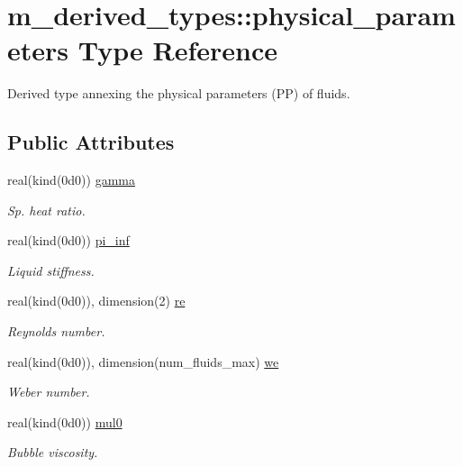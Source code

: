 \hypertarget{structm__derived__types_1_1physical__parameters}{}\section{m\+\_\+derived\+\_\+types\+:\+:physical\+\_\+parameters Type Reference}
\label{structm__derived__types_1_1physical__parameters}


Derived type annexing the physical parameters (PP) of fluids.  


\subsection*{Public Attributes}
\begin{DoxyCompactItemize}
\item 
real(kind(0d0)) \hyperlink{structm__derived__types_1_1physical__parameters_a767cbe0b3d10bf2fa0ab2e3372881413}{gamma}
\begin{DoxyCompactList}\small\item\em Sp. heat ratio. \end{DoxyCompactList}\item 
real(kind(0d0)) \hyperlink{structm__derived__types_1_1physical__parameters_a6dbc4e81d0c3ffd4fa80dcfc7a0ea31f}{pi\+\_\+inf}
\begin{DoxyCompactList}\small\item\em Liquid stiffness. \end{DoxyCompactList}\item 
real(kind(0d0)), dimension(2) \hyperlink{structm__derived__types_1_1physical__parameters_a47283d1eddead753f9c3d60ed982df49}{re}
\begin{DoxyCompactList}\small\item\em Reynolds number. \end{DoxyCompactList}\item 
real(kind(0d0)), dimension(num\+\_\+fluids\+\_\+max) \hyperlink{structm__derived__types_1_1physical__parameters_ab4e02c9d2708778476fe2e57cd163a17}{we}
\begin{DoxyCompactList}\small\item\em Weber number. \end{DoxyCompactList}\item 
real(kind(0d0)) \hyperlink{structm__derived__types_1_1physical__parameters_ac33958817dd32ef7a5536d2d1c81875f}{mul0}
\begin{DoxyCompactList}\small\item\em Bubble viscosity. \end{DoxyCompactList}\item 

\end{DoxyCompactItemize}
